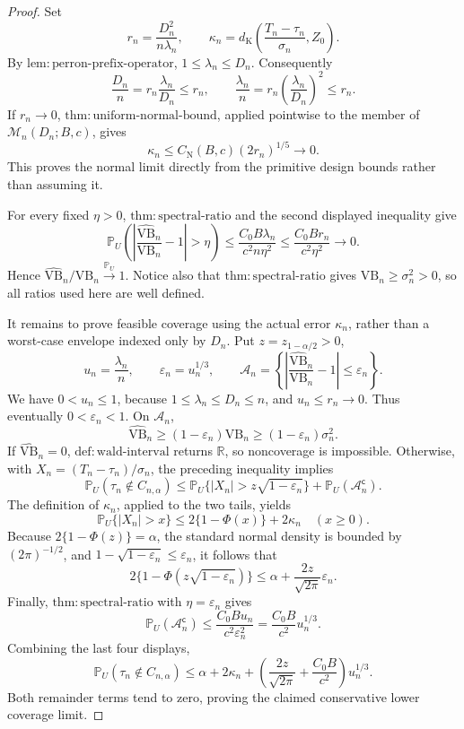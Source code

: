 \documentclass{article}
\begin{document}
\begin{proof}
Set
\[
 r_n=\frac{D_n^2}{n\lambda_n},
 \qquad
 \kappa_n=d_{\mathrm K}\left(\frac{T_n-\tau_n}{\sigma_n},Z_0\right).
\]
By \(\mathrm{lem:perron\text{-}prefix\text{-}operator}\), \(1\le\lambda_n\le D_n\).  Consequently
\[
 \frac{D_n}{n}=r_n\frac{\lambda_n}{D_n}\le r_n,
 \qquad
 \frac{\lambda_n}{n}=r_n\left(\frac{\lambda_n}{D_n}\right)^2\le r_n.
\]
If \(r_n\to0\), \(\mathrm{thm:uniform\text{-}normal\text{-}bound}\), applied pointwise to the member of \(\mathcal M_n(D_n;B,c)\), gives
\[
 \kappa_n\le C_{\mathrm N}(B,c)(2r_n)^{1/5}\longrightarrow0.
\]
This proves the normal limit directly from the primitive design bounds rather than assuming it.

For every fixed \(\eta>0\), \(\mathrm{thm:spectral\text{-}ratio}\) and the second displayed inequality give
\[
 \mathbb P_U\left(
 \left|\frac{\widehat{\mathrm{VB}}_n}{\mathrm{VB}_n}-1\right|>\eta
 \right)
 \le\frac{C_0B\lambda_n}{c^2n\eta^2}
 \le\frac{C_0B r_n}{c^2\eta^2}\longrightarrow0.
\]
Hence \(\widehat{\mathrm{VB}}_n/\mathrm{VB}_n\xrightarrow{\mathbb P_U}1\).  Notice also that \(\mathrm{thm:spectral\text{-}ratio}\) gives \(\mathrm{VB}_n\ge\sigma_n^2>0\), so all ratios used here are well defined.

It remains to prove feasible coverage using the actual error \(\kappa_n\), rather than a worst-case envelope indexed only by \(D_n\).  Put \(z=z_{1-\alpha/2}>0\),
\[
 u_n=\frac{\lambda_n}{n},
 \qquad
 \varepsilon_n=u_n^{1/3},
 \qquad
 \mathcal A_n=\left\{
 \left|\frac{\widehat{\mathrm{VB}}_n}{\mathrm{VB}_n}-1\right|
 \le\varepsilon_n\right\}.
\]
We have \(0<u_n\le1\), because \(1\le\lambda_n\le D_n\le n\), and \(u_n\le r_n\to0\).  Thus eventually \(0<\varepsilon_n<1\).  On \(\mathcal A_n\),
\[
 \widehat{\mathrm{VB}}_n
 \ge(1-\varepsilon_n)\mathrm{VB}_n
 \ge(1-\varepsilon_n)\sigma_n^2.
\]
If \(\widehat{\mathrm{VB}}_n=0\), \(\mathrm{def:wald\text{-}interval}\) returns \(\mathbb R\), so noncoverage is impossible.  Otherwise, with \(X_n=(T_n-\tau_n)/\sigma_n\), the preceding inequality implies
\[
 \mathbb P_U(\tau_n\notin C_{n,\alpha})
 \le \mathbb P_U\{|X_n|>z\sqrt{1-\varepsilon_n}\}
 +\mathbb P_U(\mathcal A_n^{\mathsf c}).
\]
The definition of \(\kappa_n\), applied to the two tails, yields
\[
 \mathbb P_U\{|X_n|>x\}\le2\{1-\Phi(x)\}+2\kappa_n
 \quad(x\ge0).
\]
Because \(2\{1-\Phi(z)\}=\alpha\), the standard normal density is bounded by \((2\pi)^{-1/2}\), and \(1-\sqrt{1-\varepsilon_n}\le\varepsilon_n\), it follows that
\[
 2\{1-\Phi(z\sqrt{1-\varepsilon_n})\}
 \le\alpha+\frac{2z}{\sqrt{2\pi}}\varepsilon_n.
\]
Finally, \(\mathrm{thm:spectral\text{-}ratio}\) with \(\eta=\varepsilon_n\) gives
\[
 \mathbb P_U(\mathcal A_n^{\mathsf c})
 \le\frac{C_0B u_n}{c^2\varepsilon_n^2}
 =\frac{C_0B}{c^2}u_n^{1/3}.
\]
Combining the last four displays,
\[
 \mathbb P_U(\tau_n\notin C_{n,\alpha})
 \le\alpha+2\kappa_n+
 \left(\frac{2z}{\sqrt{2\pi}}+\frac{C_0B}{c^2}\right)u_n^{1/3}.
\]
Both remainder terms tend to zero, proving the claimed conservative lower coverage limit.


\end{proof}
\end{document}

